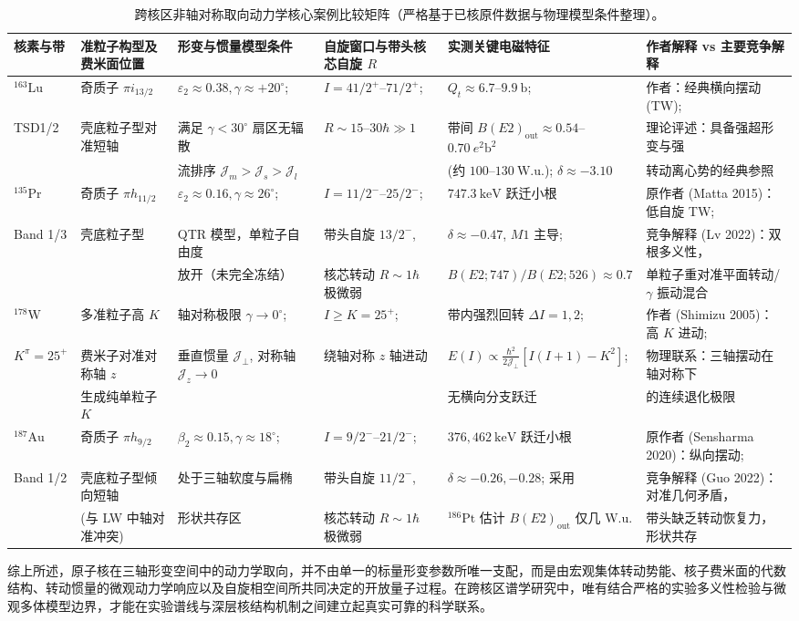 \begin{table}[!htbp]
\centering
\small
\caption{跨核区非轴对称取向动力学核心案例比较矩阵（严格基于已核原件数据与物理模型条件整理）。}\label{tab:4-4-cross-region-comparison}
\begin{tabularx}{\textwidth}{lXXXXX}
\hline\hline
核素与带 & 准粒子构型及费米面位置 & 形变与惯量模型条件 & 自旋窗口与带头核芯自旋 $R$ & 实测关键电磁特征 & 作者解释 vs 主要竞争解释 \\
\hline
$^{163}\mathrm{Lu}$ & 奇质子 $\pi i_{13/2}$ & $\varepsilon_2 \approx 0.38, \gamma \approx +20^\circ$; & $I = 41/2^+$--$71/2^+$; & $Q_t \approx 6.7$--$9.9\ \mathrm{b}$; & 作者：经典横向摆动 (TW); \\
TSD1/2 & 壳底粒子型对准短轴 & 满足 $\gamma < 30^\circ$ 扇区无辐散 & $R \sim 15$--$30\hbar \gg 1$ & 带间 $B(E2)_{\mathrm{out}} \approx 0.54$--$0.70\ e^2\mathrm{b}^2$ & 理论评述：具备强超形变与强 \\
& & 流排序 $\mathcal{J}_m > \mathcal{J}_s > \mathcal{J}_l$ & & (约 $100$--$130\ \mathrm{W.u.}$); $\delta \approx -3.10$ & 转动离心势的经典参照 \\
\hline
$^{135}\mathrm{Pr}$ & 奇质子 $\pi h_{11/2}$ & $\varepsilon_2 \approx 0.16, \gamma \approx 26^\circ$; & $I = 11/2^-$--$25/2^-$; & $747.3\ \mathrm{keV}$ 跃迁小根 & 原作者 (Matta 2015)：低自旋 TW; \\
Band 1/3 & 壳底粒子型 & QTR 模型，单粒子自由度 & 带头自旋 $13/2^-$, & $\delta \approx -0.47$, $M1$ 主导; & 竞争解释 (Lv 2022)：双根多义性， \\
& & 放开（未完全冻结） & 核芯转动 $R \sim 1\hbar$ 极微弱 & $B(E2; 747)/B(E2; 526) \approx 0.7$ & 单粒子重对准平面转动/$\gamma$ 振动混合 \\
\hline
$^{178}\mathrm{W}$ & 多准粒子高 $K$ & 轴对称极限 $\gamma \to 0^\circ$; & $I \ge K = 25^+$; & 带内强烈回转 $\Delta I = 1, 2$; & 作者 (Shimizu 2005)：高 $K$ 进动; \\
$K^\pi=25^+$ & 费米子对准对称轴 $z$ & 垂直惯量 $\mathcal{J}_\perp$, 对称轴 $\mathcal{J}_z \to 0$ & 绕轴对称 $z$ 轴进动 & $E(I) \propto \frac{\hbar^2}{2\mathcal{J}_\perp}[I(I+1)-K^2]$; & 物理联系：三轴摆动在轴对称下 \\
& 生成纯单粒子 $K$ & & & 无横向分支跃迁 & 的连续退化极限 \\
\hline
$^{187}\mathrm{Au}$ & 奇质子 $\pi h_{9/2}$ & $\beta_2 \approx 0.15, \gamma \approx 18^\circ$; & $I = 9/2^-$--$21/2^-$; & $376, 462\ \mathrm{keV}$ 跃迁小根 & 原作者 (Sensharma 2020)：纵向摆动; \\
Band 1/2 & 壳底粒子型倾向短轴 & 处于三轴软度与扁椭 & 带头自旋 $11/2^-$, & $\delta \approx -0.26, -0.28$; 采用 & 竞争解释 (Guo 2022)：对准几何矛盾， \\
& (与 LW 中轴对准冲突) & 形状共存区 & 核芯转动 $R \sim 1\hbar$ 极微弱 & $^{186}\mathrm{Pt}$ 估计 $B(E2)_{\mathrm{out}}$ 仅几 W.u. & 带头缺乏转动恢复力，形状共存 \\
\hline\hline
\end{tabularx}
\end{table}

综上所述，原子核在三轴形变空间中的动力学取向，并不由单一的标量形变参数所唯一支配，而是由宏观集体转动势能、核子费米面的代数结构、转动惯量的微观动力学响应以及自旋相空间所共同决定的开放量子过程。在跨核区谱学研究中，唯有结合严格的实验多义性检验与微观多体模型边界，才能在实验谱线与深层核结构机制之间建立起真实可靠的科学联系。
